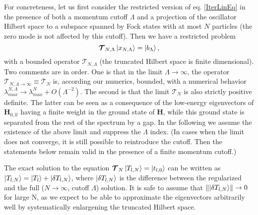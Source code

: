 \documentclass[twocolumn,secnumarabic,amssymb, nobibnotes, aps, prd]{revtex4-2}
\newcommand{\be}{\begin{equation}}
\newcommand{\ee}{\end{equation}}
\begin{document}
For concreteness, let us first consider the restricted version of eq. \eqref{IterLinEq} in the presence of both a momentum cutoff $\Lambda$ and a projection of the oscillator Hilbert space to a subspace spanned by Fock states with at most $N$ particles (the zero mode is not affected by this cutoff). Then we have a restricted problem
\be
\boldsymbol{\mathcal{T}}_{N,\Lambda}\ket{x_{N,\Lambda}}=\ket{b_\Lambda},
\ee
with a bounded operator $\boldsymbol{\mathcal{T}}_{N,\Lambda}$ (the truncated Hilbert space is finite dimensional). Two comments are in order. One is that in the limit $\Lambda\rightarrow\infty$, the operator  
$\boldsymbol{\mathcal{T}}_{N,\Lambda\rightarrow\infty}\equiv\boldsymbol{\mathcal{T}}_{N}$ is, according our numerics, bounded, with a numerical behavior $\lambda_{max}^{N,\Lambda}\rightarrow \lambda_{max}^{N}+O(\Lambda^{-2})$. The second is that the limit $\boldsymbol{\mathcal{T}}_{N}$ is also strictly positive definite. The latter can be seen as a consequence of the low-energy eigenvectors of $\mathbf{H}_{0,ll}$ having a finite weight in the ground state of $\mathbf{H}$, while this ground state is separated from the rest of the spectrum by a gap. 
In the following we assume the existence of the above limit and suppress the $\Lambda$ index. (In cases when the limit does not converge, it is still possible to reintroduce the cutoff. Then the statements below remain valid in the presence of a finite momentum cutoff.)

The exact solution to the equation $\boldsymbol{\mathcal{T}}_{N}\ket{T_{l,N}}=\ket{t_{l,0}}$ can be written as $\ket{T_{l,N}}=\ket{T_l}+\ket{\delta T_{l,N}}$, where $\ket{\delta T_{l,N}}$ is the difference between the regularized and the full ($N\rightarrow\infty$, cutoff $\Lambda$) solution. It is safe to assume that $\left\Vert \ket{\delta T_{l,N}}\right\Vert \rightarrow0$ for large N, as we expect to be able to approximate the eigenvectors arbitrarily well by systematically enlargening the truncated Hilbert space.
\end{document}
